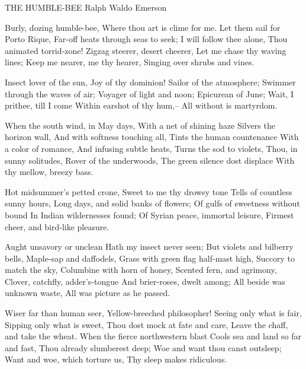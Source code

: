 THE HUMBLE-BEE
Ralph Waldo Emerson

Burly, dozing humble-bee,
Where thou art is clime for me.
Let them sail for Porto Rique,
Far-off heats through seas to seek;
I will follow thee alone,
Thou animated torrid-zone!
Zigzag steerer, desert cheerer,
Let me chase thy waving lines;
Keep me nearer, me thy hearer,
Singing over shrubs and vines.

Insect lover of the sun,
Joy of thy dominion!
Sailor of the atmosphere;
Swimmer through the waves of air;
Voyager of light and noon;
Epicurean of June;
Wait, I prithee, till I come
Within earshot of thy hum,--
All without is martyrdom.

When the south wind, in May days,
With a net of shining haze
Silvers the horizon wall,
And with softness touching all,
Tints the human countenance
With a color of romance,
And infusing subtle heats,
Turns the sod to violets,
Thou, in sunny solitudes,
Rover of the underwoods,
The green silence dost displace
With thy mellow, breezy bass.

Hot midsummer's petted crone,
Sweet to me thy drowsy tone
Tells of countless sunny hours,
Long days, and solid banks of flowers;
Of gulfs of sweetness without bound
In Indian wildernesses found;
Of Syrian peace, immortal leisure,
Firmest cheer, and bird-like pleasure.

Aught unsavory or unclean
Hath my insect never seen;
But violets and bilberry bells,
Maple-sap and daffodels,
Grass with green flag half-mast high,
Succory to match the sky,
Columbine with horn of honey,
Scented fern, and agrimony,
Clover, catchfly, adder's-tongue
And brier-roses, dwelt among;
All beside was unknown waste,
All was picture as he passed.

Wiser far than human seer,
Yellow-breeched philosopher!
Seeing only what is fair,
Sipping only what is sweet,
Thou dost mock at fate and care,
Leave the chaff, and take the wheat.
When the fierce northwestern blast
Cools sea and land so far and fast,
Thou already slumberest deep;
Woe and want thou canst outsleep;
Want and woe, which torture us,
Thy sleep makes ridiculous.

